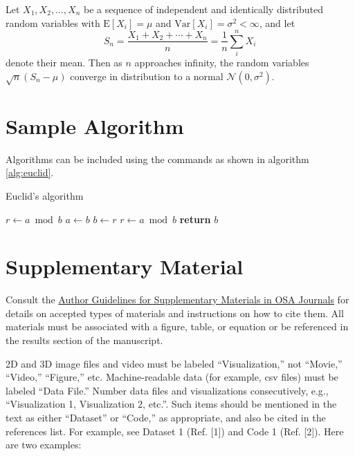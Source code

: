 \documentclass[9pt,twocolumn,twoside]{osajnl}
\begin{document}
Let $X_1, X_2, \ldots, X_n$ be a sequence of independent and identically distributed random variables with $\text{E}[X_i] = \mu$ and $\text{Var}[X_i] = \sigma^2 < \infty$, and let
\begin{equation}
S_n = \frac{X_1 + X_2 + \cdots + X_n}{n}
      = \frac{1}{n}\sum_{i}^{n} X_i
\label{eq:refname1}
\end{equation}
denote their mean. Then as $n$ approaches infinity, the random variables $\sqrt{n}(S_n - \mu)$ converge in distribution to a normal $\mathcal{N}(0, \sigma^2)$.

\section{Sample Algorithm}

Algorithms can be included using the commands as shown in algorithm \ref{alg:euclid}.

\begin{algorithm}
\caption{Euclid’s algorithm}\label{alg:euclid}
\begin{algorithmic}[1]
\State $r\gets a\bmod b$
\State $a\gets b$
\State $b\gets r$
\State $r\gets a\bmod b$
\EndWhile\label{euclidendwhile}
\State \textbf{return} $b$
\EndProcedure
\end{algorithmic}
\end{algorithm}

\section{Supplementary Material}

Consult the \href{https://www.osapublishing.org/submit/style/multimedia.cfm}{Author Guidelines for Supplementary Materials in OSA Journals} for details on accepted types of materials and instructions on how to cite them. All materials must be associated with a figure, table, or equation or be referenced in the results section of the manuscript.

2D and 3D image files and video must be labeled “Visualization,” not “Movie,” “Video,” “Figure,” etc. Machine-readable data (for example, csv files) must be labeled  “Data File.”  Number data files and visualizations consecutively, e.g., “Visualization 1, Visualization 2, etc.”. Such items should be mentioned in the text as either “Dataset” or “Code,” as appropriate, and also be cited in the references list. For example, see Dataset 1 (Ref. [1])  and Code 1 (Ref. [2]). Here are two examples:
\end{document}
